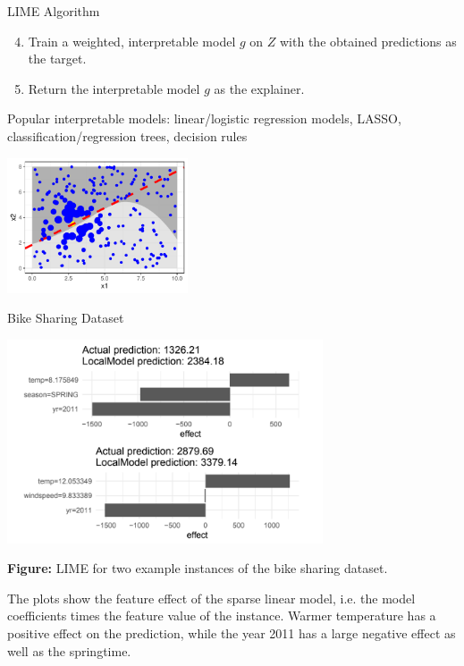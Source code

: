 \documentclass[11pt,compress,t,notes=noshow, xcolor=table]{beamer}
\begin{document}
\begin{vbframe}{LIME Algorithm}
		\framebreak
		\begin{enumerate}
			\setcounter{enumi}{3}
		\item Train a weighted, interpretable model $g$ on $Z$ with the obtained predictions as the target.
		\item Return the interpretable model $g$ as the explainer. \\[0.3cm]
			\end{enumerate}
		Popular interpretable models: linear/logistic regression models, LASSO, classification/regression trees, decision rules
					\vspace{1cm}
		\begin{center}
			\includegraphics[width=0.4\textwidth]{figure/lime5}
		\end{center}
\end{vbframe}

\begin{vbframe}{Bike Sharing Dataset}
\vspace{-.3cm}

\begin{center}
\includegraphics[width=0.7\textwidth]{figure/bike-figure.png}
\end{center} 

\footnotesize \textbf{Figure:} LIME for two example instances of the bike sharing dataset.

\normalsize
\vspace{0.2cm}
The plots show the feature effect of the sparse linear model, i.e. the model coefficients times the feature value of the instance.
Warmer temperature has a positive effect on the prediction, 
while the year 2011 has a large negative effect as well as the springtime.
\end{vbframe}
\end{document}
